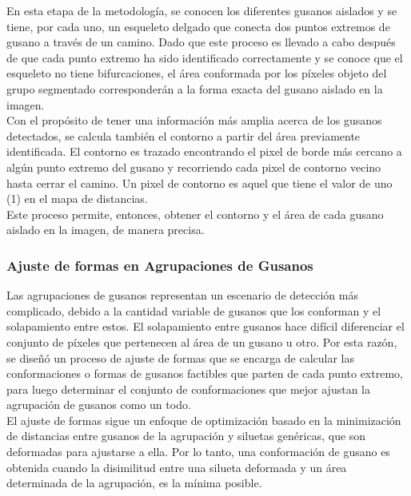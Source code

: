 En esta etapa de la metodolog\'ia, se conocen los diferentes gusanos aislados
y se tiene, por cada uno, un esqueleto delgado que conecta dos puntos
extremos de gusano a trav\'es de un camino.
Dado que este proceso es llevado a cabo despu\'es de que cada punto extremo
ha sido identificado correctamente y se conoce que el esqueleto no tiene
bifurcaciones, el \'area conformada por los p\'ixeles objeto del grupo
segmentado corresponder\'an a la forma exacta del gusano aislado en la
imagen.\\

Con el prop\'osito de tener una informaci\'on m\'as amplia acerca de los gusanos
detectados, se calcula tambi\'en el contorno a partir del \'area previamente identificada.
El contorno es trazado encontrando el pixel de borde m\'as cercano a alg\'un punto extremo
del gusano y recorriendo cada pixel de contorno vecino hasta cerrar el camino. 
Un pixel de contorno es aquel que tiene el valor de uno (1) en el mapa de distancias.\\

Este proceso permite, entonces, obtener el contorno y el \'area de cada
gusano aislado en la imagen, de manera precisa.

\subsubsection*{Ajuste de formas en Agrupaciones de Gusanos}
\label{sec:clusterfit}

Las agrupaciones de gusanos representan un escenario de detecci\'on m\'as complicado, 
debido a la cantidad variable de gusanos que los conforman y el solapamiento entre estos.
El solapamiento entre gusanos hace dif\'icil diferenciar el conjunto de p\'ixeles que pertenecen
al \'area de un gusano u otro. Por esta raz\'on, se dise\~n\'o un proceso de ajuste de formas
que se encarga de calcular las conformaciones o formas de gusanos factibles que parten
de cada punto extremo, para luego determinar el conjunto de conformaciones que mejor
ajustan la agrupaci\'on de gusanos como un todo.\\

El ajuste de formas sigue un enfoque de optimizaci\'on basado en la minimizaci\'on
de distancias entre gusanos de la agrupaci\'on y siluetas gen\'ericas, que son deformadas
para ajustarse a ella. Por lo tanto, una conformaci\'on de gusano es obtenida cuando
la disimilitud entre una silueta deformada y un \'area determinada de la agrupaci\'on, 
es la m\'inima posible.\\

